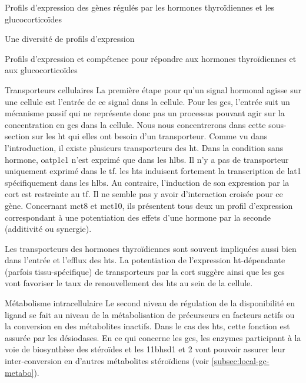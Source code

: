 \documentclass[../main.tex]{subfiles}
\begin{document}
\begin{chapter}{Profils d'expression des gènes régulés par les hormones thyroïdiennes et les glucocorticoïdes}
\begin{section}{Une diversité de profils d'expression}
\begin{subsection}{Profils d'expression et compétence pour répondre aux hormones thyroïdiennes et aux glucocorticoïdes}
\begin{subsubsection}{Transporteurs cellulaires}
La première étape pour qu'un signal hormonal agisse sur une cellule est l'entrée de ce signal dans la cellule.
Pour les \glspl{gc}, l'entrée suit un mécanisme passif qui ne représente donc pas un processus pouvant agir sur la concentration en \glspl{gc} dans la cellule.
Nous nous concentrerons dans cette sous-section sur les \gls{ht} qui elles ont besoin d'un transporteur.
Comme vu dans l'introduction, il existe plusieurs transporteurs des \gls{ht}.
Dans la condition sans hormone, \gls{oatp}1c1 n'est exprimé que dans les \glspl{hlb}.
Il n'y a pas de transporteur uniquement exprimé dans le \gls{tf}.
les \glspl{ht} induisent fortement la transcription de \gls{lat}1 spécifiquement dans les \glspl{hlb}.
Au contraire, l'induction de son expression par la \gls{cort} est restreinte au \gls{tf}.
Il ne semble pas y avoir d'interaction croisée pour ce gène.
Concernant \gls{mct}8 et \gls{mct}10, ils présentent tous deux un profil d'expression correspondant à une potentiation des effets d'une hormone par la seconde (additivité ou synergie).
\par
Les transporteurs des hormones thyroïdiennes sont souvent impliquées aussi bien dans l'entrée et l'efflux des \glspl{ht}.
La potentiation de l'expression \gls{ht}-dépendante (parfois tissu-spécifique) de transporteurs par la \gls{cort} suggère ainsi que les \glspl{gc} vont favoriser le taux de renouvellement des \glspl{ht} au sein de la cellule.
\end{subsubsection}

\begin{subsubsection}{Métabolisme intracellulaire}
Le second niveau de régulation de la disponibilité en ligand se fait au niveau de la métabolisation de précurseurs en facteurs actifs ou la conversion en des métabolites inactifs.
Dans le cas des \glspl{ht}, cette fonction est assurée par les désiodases.
En ce qui concerne les \glspl{gc}, les enzymes participant à la voie de biosynthèse des stéroïdes et les \gls{11bhsd1} et 2 vont pouvoir assurer leur inter-conversion en d'autres métabolites stéroïdiens (voir \autoref{subsec:local-gc-metabo}).


\end{subsubsection}
\end{subsection}
\end{section}
\end{chapter}
\end{document}
